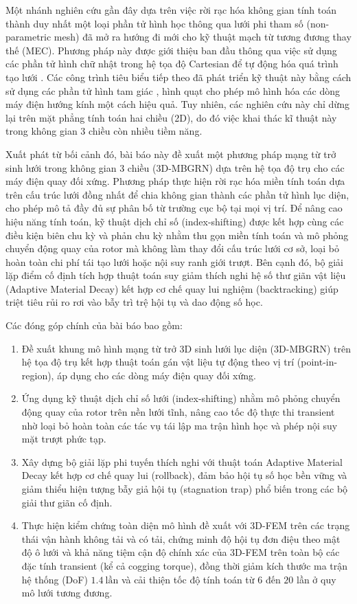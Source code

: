 Một nhánh nghiên cứu gần đây dựa trên việc rời rạc hóa không gian tính toán thành duy nhất một loại phần tử hình học thông qua lưới phi tham số (non-parametric mesh) đã mở ra hướng đi mới cho kỹ thuật mạch từ tương đương thay thế (MEC). Phương pháp này được giới thiệu ban đầu thông qua việc sử dụng các phần tử hình chữ nhật trong hệ tọa độ Cartesian để tự động hóa quá trình tạo lưới \cite{9473194}. Các công trình tiêu biểu tiếp theo đã phát triển kỹ thuật này bằng cách sử dụng các phần tử hình tam giác \cite{10018857,ouagued2016comparison}, hình quạt \cite{van2026development,lu2023hybrid,10599821} cho phép mô hình hóa các dòng máy điện hướng kính một cách hiệu quả. Tuy nhiên, các nghiên cứu này chỉ dừng lại trên mặt phẳng tính toán hai chiều (2D), do đó việc khai thác kĩ thuật này trong không gian 3 chiều còn nhiều tiềm năng.

Xuất phát từ bối cảnh đó, bài báo này đề xuất một phương pháp mạng từ trở sinh lưới trong không gian 3 chiều (3D-MBGRN) dựa trên hệ tọa độ trụ cho các máy điện quay đối xứng. Phương pháp thực hiện rời rạc hóa miền tính toán dựa trên cấu trúc lưới đồng nhất để chia không gian thành các phần tử hình lục diện, cho phép mô tả đầy đủ sự phân bố từ trường cục bộ tại mọi vị trí. Để nâng cao hiệu năng tính toán, kỹ thuật dịch chỉ số (index-shifting) được kết hợp cùng các điều kiện biên chu kỳ và phản chu kỳ nhằm thu gọn miền tính toán và mô phỏng chuyển động quay của rotor mà không làm thay đổi cấu trúc lưới cơ sở, loại bỏ hoàn toàn chi phí tái tạo lưới hoặc nội suy ranh giới trượt. Bên cạnh đó, bộ giải lặp điểm cố định tích hợp thuật toán suy giảm thích nghi hệ số thư giãn vật liệu (Adaptive Material Decay) kết hợp cơ chế quay lui nghiệm (backtracking) giúp triệt tiêu rủi ro rơi vào bẫy trì trệ hội tụ và dao động số học.

Các đóng góp chính của bài báo bao gồm:
\begin{enumerate}
    \item Đề xuất khung mô hình mạng từ trở 3D sinh lưới lục diện (3D-MBGRN) trên hệ tọa độ trụ kết hợp thuật toán gán vật liệu tự động theo vị trí (point-in-region), áp dụng cho các dòng máy điện quay đối xứng.
    \item Ứng dụng kỹ thuật dịch chỉ số lưới (index-shifting) nhằm mô phỏng chuyển động quay của rotor trên nền lưới tĩnh, nâng cao tốc độ thực thi transient nhờ loại bỏ hoàn toàn các tác vụ tái lập ma trận hình học và phép nội suy mặt trượt phức tạp.
    \item Xây dựng bộ giải lặp phi tuyến thích nghi với thuật toán Adaptive Material Decay kết hợp cơ chế quay lui (rollback), đảm bảo hội tụ số học bền vững và giảm thiểu hiện tượng bẫy giả hội tụ (stagnation trap) phổ biến trong các bộ giải thư giãn cố định.
    \item Thực hiện kiểm chứng toàn diện mô hình đề xuất với 3D-FEM trên các trạng thái vận hành không tải và có tải, chứng minh độ hội tụ đơn điệu theo mật độ ô lưới và khả năng tiệm cận độ chính xác của 3D-FEM trên toàn bộ các đặc tính transient (kể cả cogging torque), đồng thời giảm kích thước ma trận hệ thống (DoF) $1.4~\text{lần}$ và cải thiện tốc độ tính toán từ $6$ đến $20$ lần ở quy mô lưới tương đương.
\end{enumerate}

